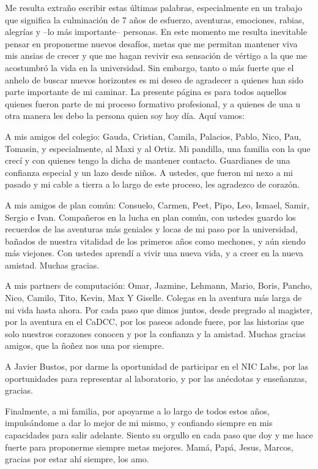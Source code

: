 \begin{thanks} %

Me resulta extraño escribir estas últimas palabras, especialmente en un trabajo que significa la culminación de 7 años de esfuerzo, aventuras, emociones, rabias, alegrías y --lo más importante-- personas. En este momento me resulta inevitable pensar en proponerme nuevos desafíos, metas que me permitan mantener viva mis ansias de crecer y que me hagan revivir esa sensación de vértigo a la que me acostumbró la vida en la universidad. Sin embargo, tanto o más fuerte que el anhelo de buscar nuevos horizontes es mi deseo de agradecer a quienes han sido parte importante de mi caminar. La presente página es para todos aquellos quienes fueron parte de mi proceso formativo profesional, y a quienes de una u otra manera les debo la persona quien soy hoy día. Aquí vamos: 
 
A mis amigos del colegio: Gauda, Cristian, Camila, Palacios, Pablo, Nico, Pau, Tomasin, y especialmente, al Maxi y al Ortiz. Mi pandilla, una familia con la que crecí y con quienes tengo la dicha de mantener contacto. Guardianes de una confianza especial y un lazo desde niños. A ustedes, que fueron mi nexo a mi pasado y mi cable a tierra a lo largo de este proceso, les agradezco de corazón. 
 
A mis amigos de plan común: Consuelo, Carmen, Peet, Pipo, Leo, Ismael, Samir, Sergio e Ivan. Compañeros en la lucha en plan común, con ustedes guardo los recuerdos de las aventuras más geniales y locas de mi paso por la universidad, bañados de nuestra vitalidad de los primeros años como mechones, y aún siendo más viejones. Con ustedes aprendí a vivir una nueva vida, y a creer en la nueva amistad. Muchas gracias. 
 
A mis partners de computación: Omar, Jazmine, Lehmann, Mario, Boris, Pancho, Nico, Camilo, Tito, Kevin, Max Y Giselle. Colegas en la aventura más larga de mi vida hasta ahora. Por cada paso que dimos juntos, desde pregrado al magister, por la aventura en el CaDCC, por los paseos adonde fuere, por las historias que solo nuestros corazones conocen y por la confianza y la amistad. Muchas gracias amigos, que la ñoñez nos una por siempre.  
 
A Javier Bustos, por darme la oportunidad de participar en el NIC Labs, por las oportunidades para representar al laboratorio, y por las anécdotas y enseñanzas, gracias.
 
Finalmente, a mi familia, por apoyarme a lo largo de todos estos años, impulsándome a dar lo mejor de mi mismo, y confiando siempre en mis capacidades para salir adelante. Siento su orgullo en cada paso que doy y me hace fuerte para proponerme siempre metas mejores. Mamá, Papá, Jesus, Marcos, gracias por estar ahí siempre, los amo.



\end{thanks}